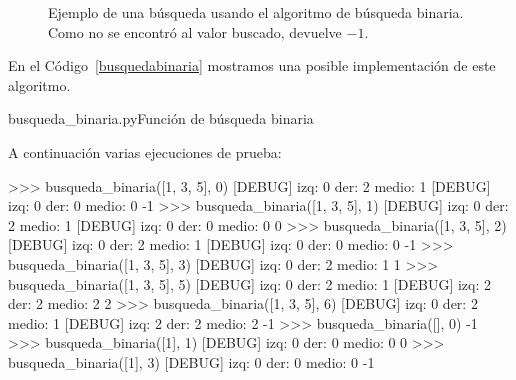 \begin{figure}[h!t]
\begin{center}
\end{center}
\caption{Ejemplo de una búsqueda usando el algoritmo de búsqueda binaria.
Como no se encontró al valor buscado, devuelve $-1$.}
\label{fig:busqbin}
\end{figure}

En el Código~\ref{busquedabinaria} mostramos una posible implementación de
este algoritmo.

\begin{codigo}{busqueda\_binaria.py}{Función de búsqueda binaria}
\label{busquedabinaria}

\end{codigo}

A continuación varias ejecuciones de prueba:

\begin{codigo-python-sn}
>>> busqueda_binaria([1, 3, 5], 0)
[DEBUG] izq: 0 der: 2 medio: 1
[DEBUG] izq: 0 der: 0 medio: 0
-1
>>> busqueda_binaria([1, 3, 5], 1)
[DEBUG] izq: 0 der: 2 medio: 1
[DEBUG] izq: 0 der: 0 medio: 0
0
>>> busqueda_binaria([1, 3, 5], 2)
[DEBUG] izq: 0 der: 2 medio: 1
[DEBUG] izq: 0 der: 0 medio: 0
-1
>>> busqueda_binaria([1, 3, 5], 3)
[DEBUG] izq: 0 der: 2 medio: 1
1
>>> busqueda_binaria([1, 3, 5], 5)
[DEBUG] izq: 0 der: 2 medio: 1
[DEBUG] izq: 2 der: 2 medio: 2
2
>>> busqueda_binaria([1, 3, 5], 6)
[DEBUG] izq: 0 der: 2 medio: 1
[DEBUG] izq: 2 der: 2 medio: 2
-1
>>> busqueda_binaria([], 0)
-1
>>> busqueda_binaria([1], 1)
[DEBUG] izq: 0 der: 0 medio: 0
0
>>> busqueda_binaria([1], 3)
[DEBUG] izq: 0 der: 0 medio: 0
-1
\end{codigo-python-sn}

